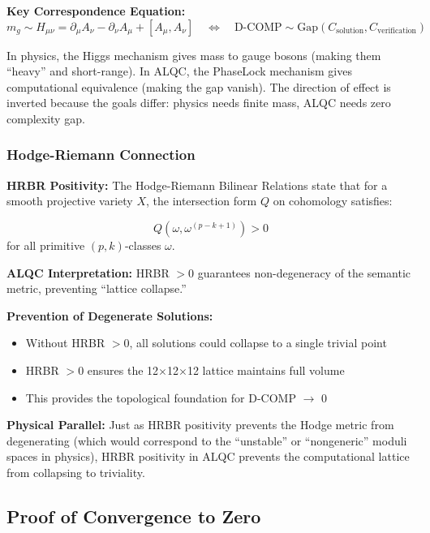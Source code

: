 \documentclass[11pt, letterpaper]{article}
\begin{document}
\textbf{Key Correspondence Equation:}
\begin{equation}
m_g \sim H_{\mu\nu} = \partial_\mu A_\nu - \partial_\nu A_\mu + [A_\mu, A_\nu] \quad \Leftrightarrow \quad \text{D-COMP} \sim \text{Gap}(C_{\text{solution}}, C_{\text{verification}})
\end{equation}

In physics, the Higgs mechanism gives mass to gauge bosons (making them ``heavy'' and short-range). In ALQC, the PhaseLock mechanism gives computational equivalence (making the gap vanish). The direction of effect is inverted because the goals differ: physics needs finite mass, ALQC needs zero complexity gap.

\subsubsection{Hodge-Riemann Connection}

\textbf{HRBR Positivity:} The Hodge-Riemann Bilinear Relations state that for a smooth projective variety $X$, the intersection form $Q$ on cohomology satisfies:

\begin{equation}
Q(\omega, \omega^{(p-k+1)}) > 0
\end{equation}
for all primitive $(p,k)$-classes $\omega$.

\textbf{ALQC Interpretation:} HRBR $> 0$ guarantees non-degeneracy of the semantic metric, preventing ``lattice collapse.''

\textbf{Prevention of Degenerate Solutions:}
\begin{itemize}
    \item Without HRBR $> 0$, all solutions could collapse to a single trivial point
    \item HRBR $> 0$ ensures the 12$\times$12$\times$12 lattice maintains full volume
    \item This provides the topological foundation for D-COMP $\to$ 0
\end{itemize}

\textbf{Physical Parallel:} Just as HRBR positivity prevents the Hodge metric from degenerating (which would correspond to the ``unstable'' or ``nongeneric'' moduli spaces in physics), HRBR positivity in ALQC prevents the computational lattice from collapsing to triviality.

\subsection{Proof of Convergence to Zero}
\end{document}
